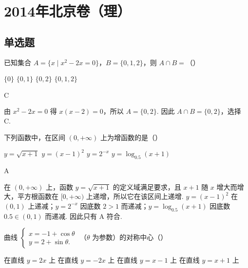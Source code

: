 \chapter{2014年北京卷（理）}

\section{单选题}

\begin{problem}
已知集合 \(A = \{x \mid x^2 - 2x = 0\}\)，\(B = \{0, 1, 2\}\)，则 \(A \cap B =\)（\quad）

\choices
    {\( \{0\} \)}
    {\(\{0, 1\}\)}
    {\(\{0, 2\}\)}
    {\(\{0, 1, 2\}\)}
\end{problem}

\begin{answer}
C
\end{answer}

\begin{solution}
由 \(x^{2}-2x=0\) 得 \(x(x-2)=0\)，所以 \(A=\{0,2\}\). 因此
\(A\cap B=\{0,2\}\)，选择 C.
\end{solution}

\begin{problem}
下列函数中，在区间 \((0, +\infty)\) 上为增函数的是（\quad）

\choices
    {\(y = \sqrt{x + 1}\)}
    {\( y = (x - 1)^{2} \)}
    {\( y = 2^{-x} \)}
    {\( y = \log_{0.5}(x + 1) \)}
\end{problem}

\begin{answer}
A
\end{answer}

\begin{solution}
在 \((0,+\infty)\) 上，函数 \(y=\sqrt{x+1}\) 的定义域满足要求，且 \(x+1\) 随 \(x\) 增大而增大，平方根函数在 \([0,+\infty)\) 上递增，所以它在该区间上递增.
\(y=(x-1)^{2}\) 在 \((0,1)\) 上递减；\(y=2^{-x}\) 因底数 \(2>1\) 而递减；\(y=\log_{0.5}(x+1)\) 因底数 \(0.5\in(0,1)\) 而递减. 因此只有 A 符合.
\end{solution}

\begin{problem}
曲线 \(\begin{cases}
x = -1 + \cos \theta\\
y = 2 + \sin \theta.
\end{cases}\) （\(\theta\) 为参数）的对称中心（\quad）

\choices
    {在直线 \( y = 2x \) 上}
    {在直线 \( y = -2x \) 上}
    {在直线 \( y = x - 1 \) 上}
    {在直线 \( y = x + 1 \) 上}
\end{problem}

